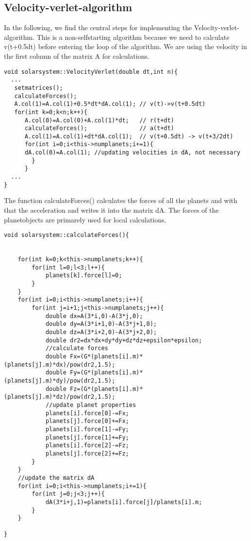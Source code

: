 \documentclass[10pt,a4paper]{article}
\begin{document}
\subsection{Velocity-verlet-algorithm}
In the following, we find the central steps for implementing the Velocity-verlet-algorithm. This is a non-selfstarting algorithm because we need to calculate v(t+0.5dt) before entering the loop of the algorithm. We are using the velocity in the first column of the matrix A for calculations.  
\begin{lstlisting}
void solarsystem::VelocityVerlet(double dt,int n){
  ...
   setmatrices();
   calculateForces();                              
   A.col(1)=A.col(1)+0.5*dt*dA.col(1); // v(t)->v(t+0.5dt)
   for(int k=0;k<n;k++){
      A.col(0)=A.col(0)+A.col(1)*dt;   // r(t+dt)
      calculateForces();               // a(t+dt)
      A.col(1)=A.col(1)+dt*dA.col(1);  // v(t+0.5dt) -> v(t+3/2dt)
      for(int i=0;i<this->numplanets;i+=1){
      dA.col(0)=A.col(1); //updating velocities in dA, not necessary
        }
      }
  ...
}
\end{lstlisting}
The function calculateForces() calculates the forces of all the planets and with that the acceleration and writes it into the matrix dA. The forces of the planetobjects are primarely used for local calculations. 
\begin{lstlisting}
void solarsystem::calculateForces(){

    
    for(int k=0;k<this->numplanets;k++){
        for(int l=0;l<3;l++){
            planets[k].force[l]=0;
        }
    }
    for(int i=0;i<this->numplanets;i++){
        for(int j=i+1;j<this->numplanets;j++){
            double dx=A(3*i,0)-A(3*j,0);
            double dy=A(3*i+1,0)-A(3*j+1,0);
            double dz=A(3*i+2,0)-A(3*j+2,0);
            double dr2=dx*dx+dy*dy+dz*dz+epsilon*epsilon;
            //calculate forces
            double Fx=(G*(planets[i].m)*(planets[j].m)*dx)/pow(dr2,1.5);
            double Fy=(G*(planets[i].m)*(planets[j].m)*dy)/pow(dr2,1.5);
            double Fz=(G*(planets[i].m)*(planets[j].m)*dz)/pow(dr2,1.5);
            //update planet properties
            planets[i].force[0]-=Fx;
            planets[j].force[0]+=Fx;
            planets[i].force[1]-=Fy;
            planets[j].force[1]+=Fy;
            planets[i].force[2]-=Fz;
            planets[j].force[2]+=Fz;
        }
    }
    //update the matrix dA
    for(int i=0;i<this->numplanets;i+=1){
        for(int j=0;j<3;j++){
            dA(3*i+j,1)=planets[i].force[j]/planets[i].m;
        }
    }
    
}
\end{lstlisting}
\end{document}
